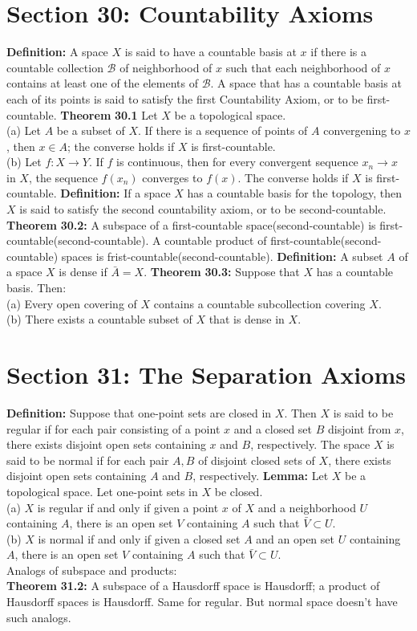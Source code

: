 \documentclass[12pt]{amsart}
\newcommand{\df}{\textbf{Definition: }}
\newcommand{\thm}{\textbf{Theorem }}
\newcommand{\lem}{\textbf{Lemma: }}
\newcommand{\x}{$x$ }
\newcommand{\X}{$X$ }
\begin{document}
\section*{Section 30: Countability Axioms}
\df A space $X$ is said to have a countable basis at $x$ if there is a countable collection $\mathscr{B}$ of neighborhood of $x$ such that each neighborhood of $x$ contains at least one of the elements of $\mathscr{B}$. A space that has a countable basis at each of its points is said to satisfy the first Countability Axiom, or to be first-countable.
\smallbreak
\thm \textbf{30.1} Let $X$ be a topological space.\\
(a) Let $A$ be a subset of $X$. If there is a sequence of points of $A$ convergening to $x$, then $x\in A$; the converse holds if $X$ is first-countable.\\
(b) Let $f: X\rightarrow Y$. If $f$ is continuous, then for every convergent sequence $x_n\rightarrow x$ in $X$, the sequence $f(x_n)$ converges to $f(x)$. The converse holds if $X$ is first-countable.
\smallbreak
\df If a space $X$ has a countable basis for the topology, then $X$ is said to satisfy the second countability axiom, or to be second-countable.
\smallbreak
\thm \textbf{30.2:} A subspace of a first-countable space(second-countable) is first-countable(second-countable). A countable product of first-countable(second-countable) spaces is frist-countable(second-countable).
\smallbreak
\df A subset $A$ of a space $X$ is dense if $\bar{A}=X$.
\smallbreak
\thm\textbf{30.3: }Suppose that $X$ has a countable basis. Then:\\
\indent (a) Every open covering of $X$ contains a countable subcollection covering $X$.\\
\indent (b) There exists a countable subset of $X$ that is dense in $X$.
\pagebreak
\section*{Section 31: The Separation Axioms}
\df Suppose that one-point sets are closed in $X$. Then $X$ is said to be regular if for each pair consisting of a point $x$ and a closed set $B$ disjoint from $x$, there exists disjoint open sets containing $x$ and $B$, respectively. The space $X$ is said to be normal if for each pair $A,B$ of disjoint closed sets of $X$, there exists disjoint open sets containing $A$ and $B$, respectively.
\smallbreak
\lem Let $X$ be a topological space. Let one-point sets in $X$ be closed.\\
\indent (a) $X$ is regular if and only if given a point \x of \X and a neighborhood $U$ containing $A$, there is an open set $V$ containing $A$ such that $\bar{V}\subset U$.\\
\indent (b) \X is normal if and only if given a closed set $A$ and an open set $U$ containing $A$, there is an open set $V$ containing $A$ such that $\bar{V} \subset U$.\\
Analogs of subspace and products:\\
\indent \thm \textbf{31.2: } A subspace of a Hausdorff space is Hausdorff; a product of Hausdorff spaces is Hausdorff. Same for regular. But normal space doesn't have such analogs.
\end{document}
